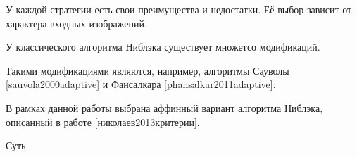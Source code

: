 У каждой стратегии есть свои преимущества и недостатки. Её выбор зависит от характера входных изображений.

У классического алгоритма Ниблэка существует множетсо модификаций.

Такими модификациями являются, например, алгоритмы Сауволы \ref{sauvola2000adaptive} и Фансалкара \ref{phansalkar2011adaptive}.

В рамках данной работы выбрана аффинный вариант алгоритма Ниблэка, описанный в работе \ref{николаев2013критерии}.

Суть 

